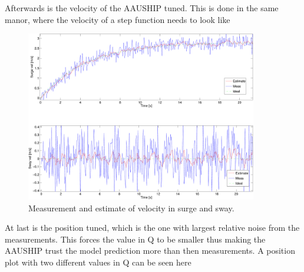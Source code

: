 Afterwards is the velocity of the AAUSHIP tuned. This is done in the same manor, where the velocity of a step function needs to look like
\begin{figure}
  \includegraphics[width=0.9\textwidth]{../../code/matlab/uv0,00001}
  \caption{Measurement and estimate of velocity in surge and sway.}
  \label{fig:uvtest}
\end{figure}
At last is the position tuned, which is the one with largest relative noise from the measurements. This forces the value in Q to be smaller thus making the AAUSHIP trust the model prediction more than then measurements. A position plot with two different values in Q can be seen here
